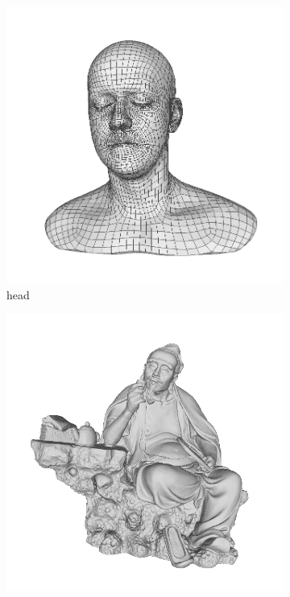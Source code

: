 \begin{figure}[!h]
	\begin{subfigure}[b]{0.23\linewidth}
		\includegraphics[width=\linewidth]{./Figures/train-dataset/28.head.png}
		\caption{head}
	\end{subfigure}
	\begin{subfigure}[b]{0.23\linewidth}
		\includegraphics[width=\linewidth]{./Figures/train-dataset/29.Lu-Yu.png}

\end{subfigure}
\end{figure}
